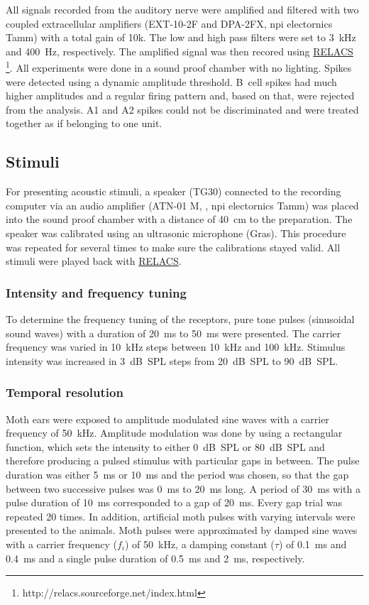 \documentclass[12pt,a4paper,pdftex]{article}
\newcommand{\relacs}[1]{\href{http://www.relacs.net}{#1}}
\begin{document}
All signals recorded from the auditory nerve were amplified and filtered with two coupled extracellular amplifiers (EXT-10-2F and DPA-2FX, npi electornics Tamm) with a total gain of 10k. The low and high pass filters were set to 3~kHz and 400~Hz, respectively. The amplified signal was then recored using \relacs{RELACS} \footnote{http://relacs.sourceforge.net/index.html}. All experiments were done in a sound proof chamber with no lighting. Spikes were detected using a dynamic amplitude threshold. B~cell spikes had much higher amplitudes and a regular firing pattern and, based on that, were rejected from the analysis. A1 and A2 spikes could not be discriminated and were treated together as if belonging to one unit. 


\subsection*{Stimuli}
For presenting acoustic stimuli, a speaker (TG30) connected to the recording computer via an audio amplifier (ATN-01 M, , npi electornics Tamm) was placed into the sound proof chamber with a distance of 40~cm to the preparation. The speaker was calibrated using an ultrasonic microphone (Gras). This procedure was repeated for several times to make sure the calibrations stayed valid. All stimuli were played back with \relacs{RELACS}.

\subsubsection*{Intensity and frequency tuning}
To determine the frequency tuning of the receptors, pure tone pulses (sinusoidal sound waves) with a duration of 20~ms to 50~ms were presented. The carrier frequency was varied in 10~kHz steps between 10~kHz and 100~kHz. Stimulus intensity was increased in 3~dB~SPL steps from 20~dB~SPL to 90~dB~SPL.

\subsubsection*{Temporal resolution}
Moth ears were exposed to amplitude modulated sine waves with a carrier frequency of 50~kHz. Amplitude modulation was done by using a rectangular function, which sets the intensity to either 0~dB~SPL or 80~dB~SPL and therefore producing a pulsed stimulus with particular gaps in between. The pulse duration was either 5~ms or 10~ms and the period was chosen, so that the gap between two successive pulses was 0~ms to 20~ms long. A period of 30~ms with a pulse duration of 10~ms corresponded to a gap of 20~ms. Every gap trial was repeated 20 times. In addition, artificial moth pulses with varying intervals were presented to the animals. Moth pulses were approximated by damped sine waves with a carrier frequency ($f_{i}$) of 50~kHz, a damping constant ($\tau$) of 0.1~ms and 0.4~ms and a single pulse duration of 0.5~ms and 2~ms, respectively.
\end{document}
